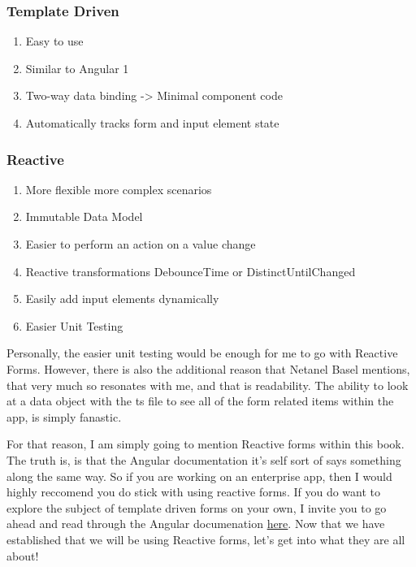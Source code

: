 \subsubsection{Template Driven}
\begin{enumerate}
  \item Easy to use
  \item Similar to Angular 1
  \item Two-way data binding -> Minimal component code
  \item Automatically tracks form and input element state
\end{enumerate}

\subsubsection{ Reactive }
\begin{enumerate}
  \item More flexible \textrightarrow{} more complex scenarios
  \item Immutable Data Model
  \item Easier to perform an action on a value change
  \item Reactive transformations \textrightarrow{} DebounceTime or DistinctUntilChanged
  \item Easily add input elements dynamically
  \item Easier Unit Testing
\end{enumerate}

Personally, the easier unit testing would be enough for me to go with 
Reactive Forms. However, there is also the additional reason that 
Netanel Basel mentions, that very much so resonates with me, and that 
is readability. The ability to look at a data object with the ts  file to see 
all of the form related items within the app, is simply fanastic. 

For that reason, I am simply going to mention Reactive forms within this book. 
The truth is, is that the Angular documentation it's self sort of says 
something along the same way. So if you are working on an enterprise app, then 
I would highly reccomend you do stick with using reactive forms. If you do 
want to explore the subject of template driven forms on your own, I invite you
to go ahead and read through the Angular documenation 
\href{https://angular.io/guide/forms-overview#setup-in-template-driven-forms}{here}. 
Now that we have established that we will be using Reactive forms, let's get into 
what they are all about!

